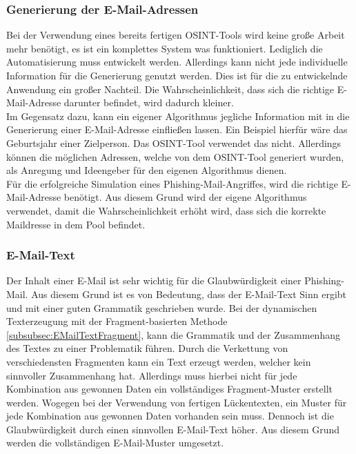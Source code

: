 	\subsubsection{Generierung der E-Mail-Adressen}
	Bei der Verwendung eines bereits fertigen OSINT-Tools wird keine große Arbeit mehr benötigt, es ist ein komplettes System was funktioniert. Lediglich die Automatisierung muss entwickelt werden. Allerdings kann nicht jede individuelle Information für die Generierung genutzt werden. Dies ist für die zu entwickelnde Anwendung ein großer Nachteil. Die Wahrscheinlichkeit, dass sich die richtige E-Mail-Adresse darunter befindet, wird dadurch kleiner.\\
	Im Gegensatz dazu, kann ein eigener Algorithmus jegliche Information mit in die Generierung einer E-Mail-Adresse einfließen lassen. Ein Beispiel hierfür wäre das Geburtsjahr einer Zielperson. Das OSINT-Tool \cite{EmailAssumptions} verwendet das nicht. Allerdings können die möglichen Adressen, welche von dem OSINT-Tool generiert wurden, als Anregung und Ideengeber für den eigenen Algorithmus dienen.\\
	Für die erfolgreiche Simulation eines Phishing-Mail-Angriffes, wird die richtige E-Mail-Adresse benötigt. Aus diesem Grund wird der eigene Algorithmus verwendet, damit die Wahrscheinlichkeit erhöht wird, dass sich die korrekte Maildresse in dem Pool befindet.
	
	\subsubsection{E-Mail-Text}
	Der Inhalt einer E-Mail ist sehr wichtig für die Glaubwürdigkeit einer Phishing-Mail. Aus diesem Grund ist es von Bedeutung, dass der E-Mail-Text Sinn ergibt und mit einer guten Grammatik geschrieben wurde. Bei der dynamischen Texterzeugung mit der Fragment-basierten Methode \ref{subsubsec:EMailTextFragment}, kann die Grammatik und der Zusammenhang des Textes zu einer Problematik führen. Durch die Verkettung von verschiedensten Fragmenten kann ein Text erzeugt werden, welcher kein sinnvoller Zusammenhang hat. Allerdings muss hierbei nicht für jede Kombination aus gewonnen Daten ein vollständiges Fragment-Muster erstellt werden. Wogegen bei der Verwendung von fertigen Lückentexten, ein Muster für jede Kombination aus gewonnen Daten vorhanden sein muss. Dennoch ist die Glaubwürdigkeit durch einen sinnvollen E-Mail-Text höher. Aus diesem Grund werden die vollständigen E-Mail-Muster umgesetzt.


	
